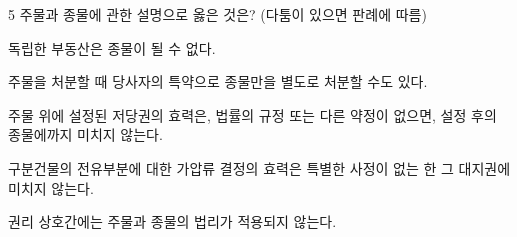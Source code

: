 \begin{question}{5}
주물과 종물에 관한 설명으로 옳은 것은? (다툼이 있으면 판례에 따름)
\begin{choices}
  \item 독립한 부동산은 종물이 될 수 없다.
  \item 주물을 처분할 때 당사자의 특약으로 종물만을 별도로 처분할 수도 있다.
  \item 주물 위에 설정된 저당권의 효력은, 법률의 규정 또는 다른 약정이 없으면, 설정 후의 종물에까지 미치지 않는다.
  \item 구분건물의 전유부분에 대한 가압류 결정의 효력은 특별한 사정이 없는 한 그 대지권에 미치지 않는다.
  \item 권리 상호간에는 주물과 종물의 법리가 적용되지 않는다.
\end{choices}
\end{question}
